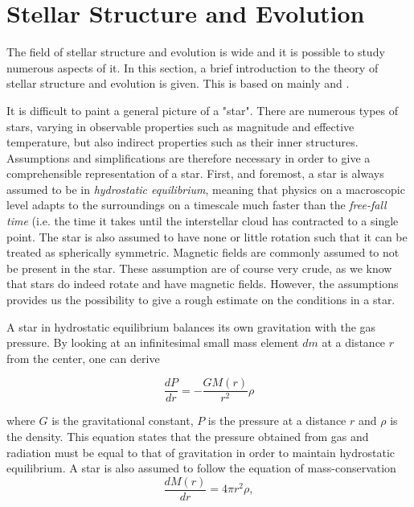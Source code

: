 \chapter{Stellar Structure and Evolution}
\label{stellarstruc}
The field of stellar structure and evolution is wide and it is possible to study numerous aspects of it. In this section, a brief introduction to the theory of stellar structure and evolution is given. This is based on mainly \citet{christensen2008lecture} and \citet{kippenhahn1990stellar}.   

It is difficult to paint a general picture of a "star". There are numerous types of stars, varying in observable properties such as magnitude and effective temperature, but also indirect properties such as their inner structures. Assumptions and simplifications are therefore necessary in order to  give a comprehensible  representation of a star. First, and foremost, a star is always assumed to be in \textit{hydrostatic equilibrium}, meaning that physics on a macroscopic level adapts to the surroundings on a timescale much faster than the \textit{free-fall time} (i.e. the time it takes until the interstellar cloud has contracted to a single point. The star is also assumed to have none or little rotation such that it can be treated as spherically symmetric. Magnetic fields are commonly assumed to not be present in the star. These assumption are of course very crude, as we know that stars do indeed rotate and have magnetic fields. However, the assumptions provides us the possibility to give a rough estimate on the conditions in a star. 

A star in hydrostatic equilibrium balances its own gravitation with the gas pressure. By looking at an infinitesimal small mass element $dm$ at a distance $r$ from the center, one can derive

\begin{equation}
    \frac{dP}{dr} = - \frac{GM(r)}{r^2}\rho
\end{equation}

\noindent where $G$ is the gravitational constant, $P$ is the pressure at a distance $r$ and $\rho$ is the density. This equation states that the pressure obtained from gas and radiation must be equal to that of gravitation in order to maintain hydrostatic equilibrium. A star is also assumed to follow the equation of mass-conservation 
\begin{equation}
    \frac{dM(r)}{dr}  = 4\pi r^2 \rho,
\end{equation}

